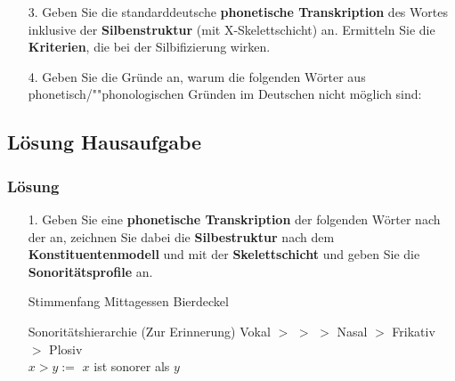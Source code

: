 {\begin{frame}
\begin{itemize}
Stellen Sie fest, ob alle Silben wohlgeformt sind. Falls nicht, benennen Sie die Verletzungen	
\ea\label{ex:HA2}
Urinstinkt
\z	
\item[3.] Geben Sie die standarddeutsche \textbf{phonetische Transkription} des Wortes  inklusive der \textbf{Silbenstruktur} (mit X-Skelettschicht) an. Ermitteln Sie die \textbf{Kriterien}, die bei der Silbifizierung wirken.

\item[4.] Geben Sie die Gründe an, warum die folgenden Wörter aus phonetisch/""phonologischen Gründen im Deutschen nicht möglich sind:

\eal\label{ex:HA3}
\ex[*]{\textipa{['Napl.O:t]}}
\ex[*]{\textipa{[a\;R.'tUng]}}
\zl

\end{itemize}

\end{frame}



 \subsection*{Lösung Hausaufgabe}
%


\begin{frame}%
\frametitle{Lösung}
\begin{itemize}

\item[1.] Geben Sie eine \textbf{phonetische Transkription} der folgenden Wörter nach der  an, zeichnen Sie dabei die \textbf{Silbestruktur} nach dem \textbf{Konstituentenmodell} und mit der \textbf{Skelettschicht} und geben Sie die \textbf{Sonoritätsprofile} an.

\begin{exe}
\exi{(\ref{ex:HA1})}
\begin{xlist}
\ex Stimmenfang
\ex Mittagessen
\ex Bierdeckel
\end{xlist}
\end{exe}

\begin{block}{Sonoritätshierarchie (Zur Erinnerung)}
Vokal $>$ \textipa{/\textscr /} $>$  $>$ Nasal $>$ Frikativ $>$ Plosiv \\
$x > y :=$ $x$ ist sonorer als $y$
\end{block}


\end{itemize}
\end{frame}}
